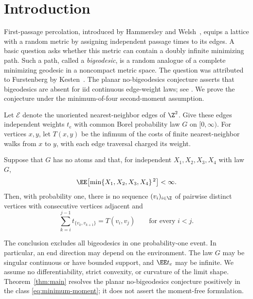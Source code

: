 \section{Introduction}
\label{sec:introduction}

First-passage percolation, introduced by Hammersley and
Welsh~\cite{HammersleyWelsh1965}, equips a lattice with a random metric
by assigning independent passage times to its edges. A basic question asks
whether this metric can contain a doubly infinite minimizing path.
Such a path, called a \emph{bigeodesic}, is a random analogue of a
complete minimizing geodesic in a noncompact metric space.
The question was attributed to Furstenberg by
Kesten~\cite[Remark 9.22]{Kesten}.
The planar no-bigeodesics conjecture asserts that bigeodesics are absent
for iid continuous edge-weight laws; see
\cite[Conjecture 1 and the discussion preceding it]{DamronHanson}.
We prove the conjecture under the minimum-of-four second-moment
assumption.

Let \(\mathcal E\) denote the unoriented nearest-neighbor edges of
\(\Z^2\). Give these edges independent weights \(t_e\) with common
Borel probability law \(G\) on \([0,\infty)\). For vertices \(x,y\),
let \(T(x,y)\) be the infimum of the costs of finite nearest-neighbor
walks from \(x\) to \(y\), with each edge traversal charged its weight.

\begin{theorem}\label{thm:main}
Suppose that \(G\) has no atoms and that, for independent
\(X_1,X_2,X_3,X_4\) with law \(G\),
\begin{equation}\label{eq:minimum-moment}
 \EE\!\left[\min\{X_1,X_2,X_3,X_4\}^{\,2}\right]<\infty.
\end{equation}
Then, with probability one, there is no sequence
\((v_i)_{i\in\Z}\) of pairwise distinct vertices with consecutive
vertices adjacent and
\[
 \sum_{k=i}^{j-1}t_{\{v_k,v_{k+1}\}}=T(v_i,v_j)
 \qquad\text{for every }i<j.
\]
\end{theorem}

The conclusion excludes all bigeodesics in one probability-one event.
In particular, an end direction may depend on the environment.
The law \(G\) may be singular continuous or have bounded support,
and \(\EE t_e\) may be infinite. We assume no differentiability,
strict convexity, or curvature of the limit shape.
Theorem~\ref{thm:main} resolves the planar no-bigeodesics conjecture
positively in the class \eqref{eq:minimum-moment}; it does not
assert the moment-free formulation.


